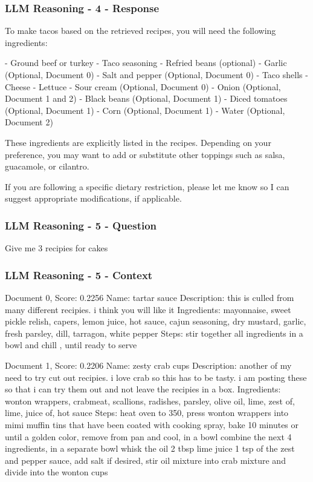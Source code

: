\documentclass[a4paper,11pt]{article}
\begin{document}
\subsubsection{LLM Reasoning - 4 - Response}
To make tacos based on the retrieved recipes, you will need the following ingredients:

- Ground beef or turkey
- Taco seasoning
- Refried beans (optional)
- Garlic (Optional, Document 0)
- Salt and pepper (Optional, Document 0)
- Taco shells
- Cheese
- Lettuce
- Sour cream (Optional, Document 0)
- Onion (Optional, Document 1 and 2)
- Black beans (Optional, Document 1)
- Diced tomatoes (Optional, Document 1)
- Corn (Optional, Document 1)
- Water (Optional, Document 2)

These ingredients are explicitly listed in the recipes. Depending on your preference, you may want to add or substitute other toppings such as salsa, guacamole, or cilantro.

If you are following a specific dietary restriction, please let me know so I can suggest appropriate modifications, if applicable.

\subsubsection{LLM Reasoning - 5 - Question}
Give me 3 recipies for cakes

\subsubsection{LLM Reasoning - 5 - Context}
Document 0, Score: 0.2256
Name: tartar sauce
Description: this is culled from many different recipies.  i think you will like it
Ingredients: mayonnaise, sweet pickle relish, capers, lemon juice, hot sauce, cajun seasoning, dry mustard, garlic, fresh parsley, dill, tarragon, white pepper
Steps: stir together all ingredients in a bowl and chill , until ready to serve

Document 1, Score: 0.2206
Name: zesty crab cups
Description: another of my need to try cut out recipies. i love crab so this has to be tasty. i am posting these so  that i can try them out and not leave the recipies in a box.
Ingredients: wonton wrappers, crabmeat, scallions, radishes, parsley, olive oil, lime, zest of, lime, juice of, hot sauce
Steps: heat oven to 350, press wonton wrappers into mimi muffin tins that have been coated with cooking spray, bake 10 minutes or until a golden color, remove from pan and cool, in a bowl combine the next 4 ingredients, in a separate bowl whisk the oil 2 tbsp lime juice 1 tsp of the zest and pepper sauce, add salt if desired, stir oil mixture into crab mixture and divide into the wonton cups
\end{document}
